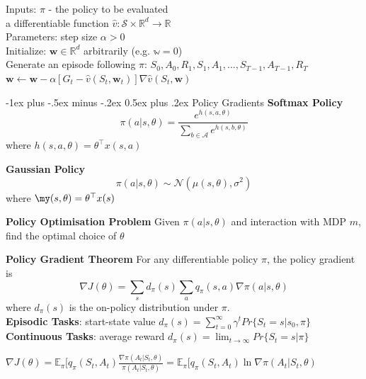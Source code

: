 \documentclass[10pt,landscape]{article}
\makeatletter
\renewcommand{\section}{\@startsection{section}{1}{0mm}%
                                {-1ex plus -.5ex minus -.2ex}%
                                {0.5ex plus .2ex}%
                                {\normalfont\large\bfseries}}
\makeatother
\begin{document}
\begin{multicols}{3}
\begin{algorithm}[H]
Inputs: $\pi$ - the policy to be evaluated \\
		a differentiable function $\hat{v} : \mathcal{S} \times \mathbb{R}^d \rightarrow \mathbb{R}$ \\
Parameters: step size $\alpha > 0$ \\
Initialize: $\mathbf{w} \in \mathbb{R}^d$ arbitrarily (e.g. $\mathbb{w} = 0$) \\
{
    Generate an episode following $\pi$: $S_0, A_0, R_1, S_1, A_1,..., S_{T-1}, A_{T-1}, R_T$\\
    {
		$\mathbf{w} \leftarrow \mathbf{w} - \alpha \left [ G_t - \hat{v}(S_t, \mathbf{w}_t) \right ] \nabla \hat{v}(S_t, \mathbf{w})$
    }
 }
\caption{Gradient MC - Estimating $v \sim v_{\pi}$ [§9.3]}
\end{algorithm}


\section{Policy Gradients}
\textbf{Softmax Policy} $$\pi(a|s, \theta) = \frac{e^{h(s,a,\theta)}}{\sum_{b \in \mathcal{A}}e^{h(s,b,\theta)}}$$ where $h(s,a,\theta) = \theta^\top x(s,a)$

\textbf{Gaussian Policy} $$\pi(a|s, \theta) \sim \mathcal{N}(\mu(s, \theta), \sigma^2)$$ where $\my(s, \theta) = \theta^\top x(s)$

\textbf{Policy Optimisation Problem} Given $\pi(a|s, \theta)$ and interaction with MDP $m$, find the optimal choice of $\theta$

\textbf{Policy Gradient Theorem} For any differentiable policy $\pi$, the policy gradient is $$\nabla J(\theta) = \sum_s d_\pi (s) \sum_a q_\pi (s,a) \nabla \pi(a|s, \theta)$$ where $d_\pi(s)$ is the on-policy distribution under $\pi$. \\

\textbf{Episodic Tasks}: start-state value $d_\pi (s) = \sum_{t=0}^\infty \gamma^t Pr\{S_t = s | s_0, \pi\}$
\textbf{Continuous Tasks}: average reward $d_\pi (s) = \lim_{t \rightarrow \infty} Pr\{S_t = s | \pi\}$

$\nabla J(\theta) = \mathbb{E}_\pi [q_\pi(S_t, A_t) \frac{\nabla \pi(A_t | S_t, \theta)}{\pi (A_t | S_t, \theta)} = \mathbb{E}_\pi [q_\pi(S_t, A_t) \ln \nabla \pi(A_t | S_t, \theta)$


\end{multicols}
\end{document}

